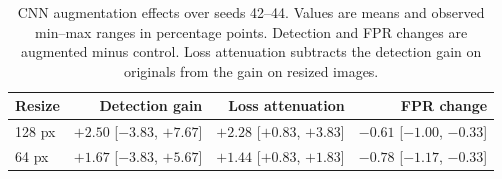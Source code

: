 \begin{table}[tb]
\centering
\small
\caption{CNN augmentation effects over seeds 42--44. Values are means and observed min--max ranges in percentage points. Detection and FPR changes are augmented minus control. Loss attenuation subtracts the detection gain on originals from the gain on resized images.}
\label{tab:cnn-augmentation}
\begin{tabular}{lrrr}
\hline
Resize & Detection gain & Loss attenuation & FPR change \\
\hline
128 px & $+2.50$ [$-3.83$, $+7.67$] & $+2.28$ [$+0.83$, $+3.83$] & $-0.61$ [$-1.00$, $-0.33$] \\
64 px & $+1.67$ [$-3.83$, $+5.67$] & $+1.44$ [$+0.83$, $+1.83$] & $-0.78$ [$-1.17$, $-0.33$] \\
\hline
\end{tabular}
\end{table}
